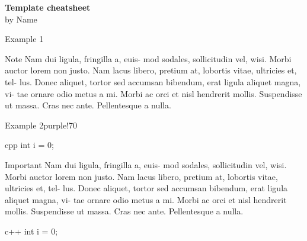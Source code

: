 \documentclass[10pt, a4paper, landscape]{article}
\begin{document}
	
\begin{onehalfspace}
	
	\begin{multicols*}{4}
	
		\begin{flushleft}
			\LARGE{\bf{\textcolor{\mainColor}{\textbf{Template cheatsheet}}}} \\
			\large{by \textcolor{\mainColor}{Name}}
		\end{flushleft}
		
		\begin{Text}{Example 1}
			 \lipsum[1]
			
			\begin{Note}{Note}
				Nam dui ligula, fringilla a, euis-
				mod sodales, sollicitudin vel, wisi. Morbi
				auctor lorem non justo. Nam lacus libero,
				pretium at, lobortis vitae, ultricies et, tel-
				lus.
				 Donec aliquet, tortor sed accumsan
				bibendum, erat ligula aliquet magna, vi-
				tae ornare odio metus a mi. Morbi ac
				orci et nisl hendrerit mollis. Suspendisse
				ut massa. Cras nec ante. Pellentesque
				a nulla. 
			
			\end{Note}
		
			\lipsum[3-4]
		\end{Text}
	
		\begin{TextColor}{Example 2}{purple!70}		
			\lipsum[2]
			
\begin{CodeMinted}{cpp}
int i = 0;
\end{CodeMinted}
			
			\begin{Important}{Important}
				Nam dui ligula, fringilla a, euis-
				mod sodales, sollicitudin vel, wisi. Morbi
				auctor lorem non justo.
				Nam lacus libero,
				pretium at, lobortis vitae, ultricies et, tel-
				lus.
				\splitImportant
				Donec aliquet, tortor sed accumsan
				bibendum, erat ligula aliquet magna, vi-
				tae ornare odio metus a mi.
				Morbi ac
				orci et nisl hendrerit mollis. Suspendisse
				ut massa. Cras nec ante. Pellentesque
				a nulla. 
			\end{Important}
		
\begin{CodeListing}{c++}
int i = 0;
\end{CodeListing}
			
			\lipsum[3-6]
		\end{TextColor}
		
	\end{multicols*}

\end{onehalfspace}
	
\end{document}
